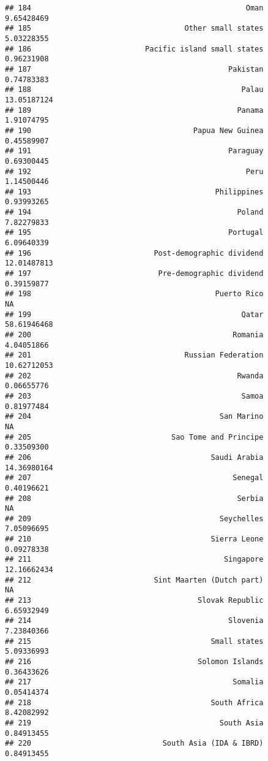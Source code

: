 \documentclass[]{article}
\begin{document}
\begin{verbatim}
## 184                                                 Oman  9.65428469
## 185                                   Other small states  5.03228355
## 186                          Pacific island small states  0.96231908
## 187                                             Pakistan  0.74783383
## 188                                                Palau 13.05187124
## 189                                               Panama  1.91074795
## 190                                     Papua New Guinea  0.45589907
## 191                                             Paraguay  0.69300445
## 192                                                 Peru  1.14500446
## 193                                          Philippines  0.93993265
## 194                                               Poland  7.82279833
## 195                                             Portugal  6.09640339
## 196                            Post-demographic dividend 12.01487813
## 197                             Pre-demographic dividend  0.39159877
## 198                                          Puerto Rico          NA
## 199                                                Qatar 58.61946468
## 200                                              Romania  4.04051866
## 201                                   Russian Federation 10.62712053
## 202                                               Rwanda  0.06655776
## 203                                                Samoa  0.81977484
## 204                                           San Marino          NA
## 205                                Sao Tome and Principe  0.33509300
## 206                                         Saudi Arabia 14.36980164
## 207                                              Senegal  0.40196621
## 208                                               Serbia          NA
## 209                                           Seychelles  7.05096695
## 210                                         Sierra Leone  0.09278338
## 211                                            Singapore 12.16662434
## 212                            Sint Maarten (Dutch part)          NA
## 213                                      Slovak Republic  6.65932949
## 214                                             Slovenia  7.23840366
## 215                                         Small states  5.09336993
## 216                                      Solomon Islands  0.36433626
## 217                                              Somalia  0.05414374
## 218                                         South Africa  8.42082992
## 219                                           South Asia  0.84913455
## 220                              South Asia (IDA & IBRD)  0.84913455

\end{verbatim}
\end{document}
